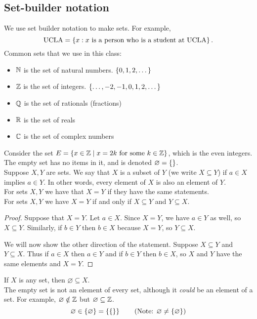 \documentclass[class=article, crop=false]{standalone}
\begin{document}
  \subsection{Set-builder notation}
  We use set builder notation to make sets. For example,
  \[
    \text{UCLA} = \left\{x : x \text{ is a person who is a student at UCLA}\right\}.
  \]
  Common sets that we use in this class:
  \begin{itemize}
    \item $\mathbb{N}$ is the set of natural numbers. $\left\{0, 1, 2, \dotsc\right\}$
    \item $\mathbb{Z}$ is the set of integers. $\left\{\dotsc, -2, -1, 0, 1, 2, \dotsc\right\}$
    \item $\mathbb{Q}$ is the set of rationals (fractions)
    \item $\mathbb{R}$ is the set of reals
    \item $\mathbb{C}$ is the set of complex numbers
  \end{itemize}
  Consider the set $E = \left\{x\in \mathbb{Z}\mid x=  2k\text{ for some }k\in \mathbb{Z}\right\}$, which is the even integers. The empty set has no items in it, and is denoted $\varnothing = \left\{\right\}$. \\
   Suppose $X, Y$ are sets. We say that $X$ is a subset of $Y$ (we write $X \subseteq Y$) if $a \in X$ implies $a \in Y$. In other words, every element of $X$ is also an element of $Y$. \\
   For sets $X, Y$ we have that $X = Y$ if they have the same statements. \\
   For sets $X, Y$ we have $X = Y$ if and only if $X \subseteq Y$ and $Y \subseteq X$.
  \begin{proof}
    Suppose that $X = Y$. Let $a \in X$. Since $X = Y$, we have $a \in Y$ as well, so $X \subseteq Y$. Similarly, if $b \in Y$ then $b \in X$ because $X = Y$, so $Y \subseteq X$. \par
    We will now show the other direction of the statement. Suppose $X \subseteq Y$ and $Y \subseteq X$. Thus if $a \in X$ then $a \in Y$ and if $b \in Y$ then $b \in X$, so $X$ and $Y$ have the same elements and $X = Y$.
  \end{proof}
  \noindent{} If $X$ is any set, then $\varnothing \subseteq X$. \\
  The empty set is not an element of every set, although it \emph{could} be an element of a set. For example, $\varnothing \notin \mathbb{Z}$ but $\varnothing \subseteq \mathbb{Z}$.
  \[
    \varnothing \in \set{\varnothing} = \set{\set{}} \tag{Note: $\varnothing \neq \set{\varnothing}$}
  \]
\end{document}
